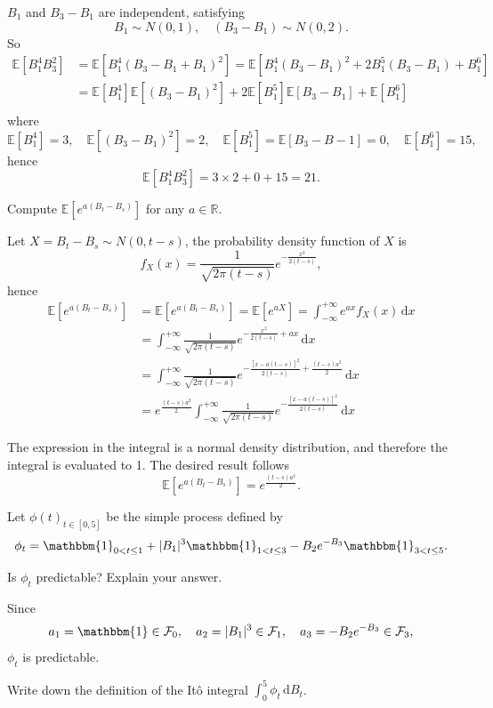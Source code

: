 \documentclass{MFM-hw} %
\newcommand{\dd}{\,\mathrm{d}}
\newcommand{\EE}{\mathbb{E}}
\begin{document}
$B_1$ and $B_3 - B_1$ are independent, satisfying
\[
B_1 \sim N(0,1), \quad (B_3 - B_1) \sim N (0, 2).
\]
So
\begin{align*}
    \EE[B_1^4B_3^2] &= \EE[B_1^4(B_3-B_1+B_1)^2] = \EE[B_1^4(B_3-B_1)^2+2B_1^5(B_3-B_1)+B_1^6] \\
                    &= \EE[B_1^4]\EE[(B_3-B_1)^2] + 2\EE[B_1^5]\EE[B_3-B_1] + \EE[B_1^6] \\
\end{align*}
where
\[
    \EE[B_1^4] = 3, \quad \EE[(B_3-B_1)^2] = 2, \quad \EE[B_1^5] = \EE[B_3-B-1] = 0, \quad \EE[B_1^6] = 15,
\]
hence
\[
    \EE[B_1^4B_3^2] = 3 \times 2 + 0 + 15 = 21.
\]

\HWsubproblem
Compute $\EE[e^{a(B_t-B_s)}]$ for any $a \in \mathbb{R}$.

Let $X = B_t -B_s \sim N(0, t-s)$, the probability density function of $X$ is 
\[
    f_X(x) = \frac{1}{\sqrt{2\pi (t-s)}} e^{-\frac{x^2}{2(t-s)}},
\]
hence
\begin{align*}
    \EE[e^{a(B_t-B_s)}] &= 
    \EE[e^{a(B_t-B_s)}] = \EE[e^{aX}] = \int_{-\infty}^{+\infty} e^{ax} f_X(x) \dd x  \\
    &= \int_{-\infty}^{+\infty} \frac{1}{\sqrt{2\pi (t-s)}} e^{-\frac{x^2}{2(t-s)}+ax} \dd x \\
    &= \int_{-\infty}^{+\infty} \frac{1}{\sqrt{2\pi (t-s)}} e^{-\frac{[x-a(t-s)]^2}{2(t-s)}+\frac{(t-s)a^2}{2}} \dd x \\
    &= e^{\frac{(t-s)a^2}{2}}\int_{-\infty}^{+\infty} \frac{1}{\sqrt{2\pi (t-s)}} e^{-\frac{[x-a(t-s)]^2}{2(t-s)}} \dd x
\end{align*}

The expression in the integral is a normal density distribution, and therefore the integral
is evaluated to 1. The desired result follows
\[
    \EE[e^{a(B_t-B_s)}] = e^{\frac{(t-s)a^2}{2}}.
\]

\HWproblem
Let $\phi(t)_{t\in[0,5]}$ be the simple process defined by
\[
    \phi_t = \mathbbm{1}_{0<t\leq 1} + |B_1|^3 \mathbbm{1}_{1 < t \leq 3} - B_2 e^{-B_3} \mathbbm{1}_{3<t \leq 5}.
\]

\HWsubproblem
Is $\phi_t$ predictable? Explain your answer.

Since
\[
    a_1 = \mathbbm{1} \in \mathcal{F}_0, \quad a_2 = |B_1|^3 \in \mathcal{F}_1, \quad a_3 = -B_2 e^{-B_3} \in \mathcal{F}_3,
\]
$\phi_t$ is predictable.

\HWsubproblem
Write down the definition of the Itô integral $\int_0^5 \phi_t \dd B_t$. 
\end{document}
